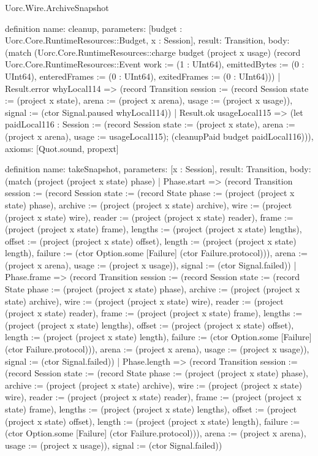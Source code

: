 \begin{lexlean}{Uorc.Wire.ArchiveSnapshot}
\begin{semanticmodule}
definition{
  name: cleanup,
  parameters: [budget : Uorc.Core.RuntimeResources::Budget, x : Session],
  result: Transition,
  body: (match (Uorc.Core.RuntimeResources::charge budget (project x usage) (record Uorc.Core.RuntimeResources::Event {work := (1 : UInt64), emittedBytes := (0 : UInt64), enteredFrames := (0 : UInt64), exitedFrames := (0 : UInt64)}))
    | Result.error whyLocal114 => (record Transition {session := (record Session {state := (project x state), arena := (project x arena), usage := (project x usage)}), signal := (ctor Signal.paused whyLocal114)})
    | Result.ok usageLocal115 => (let paidLocal116 : Session := (record Session {state := (project x state), arena := (project x arena), usage := usageLocal115}); (cleanupPaid budget paidLocal116))),
  axioms: [Quot.sound, propext]
}

definition{
  name: takeSnapshot,
  parameters: [x : Session],
  result: Transition,
  body: (match (project (project x state) phase)
    | Phase.start => (record Transition {session := (record Session {state := (record State {phase := (project (project x state) phase), archive := (project (project x state) archive), wire := (project (project x state) wire), reader := (project (project x state) reader), frame := (project (project x state) frame), lengths := (project (project x state) lengths), offset := (project (project x state) offset), length := (project (project x state) length), failure := (ctor Option.some [Failure] (ctor Failure.protocol))}), arena := (project x arena), usage := (project x usage)}), signal := (ctor Signal.failed)})
    | Phase.frame => (record Transition {session := (record Session {state := (record State {phase := (project (project x state) phase), archive := (project (project x state) archive), wire := (project (project x state) wire), reader := (project (project x state) reader), frame := (project (project x state) frame), lengths := (project (project x state) lengths), offset := (project (project x state) offset), length := (project (project x state) length), failure := (ctor Option.some [Failure] (ctor Failure.protocol))}), arena := (project x arena), usage := (project x usage)}), signal := (ctor Signal.failed)})
    | Phase.length => (record Transition {session := (record Session {state := (record State {phase := (project (project x state) phase), archive := (project (project x state) archive), wire := (project (project x state) wire), reader := (project (project x state) reader), frame := (project (project x state) frame), lengths := (project (project x state) lengths), offset := (project (project x state) offset), length := (project (project x state) length), failure := (ctor Option.some [Failure] (ctor Failure.protocol))}), arena := (project x arena), usage := (project x usage)}), signal := (ctor Signal.failed)})
}
\end{semanticmodule}
\end{lexlean}
